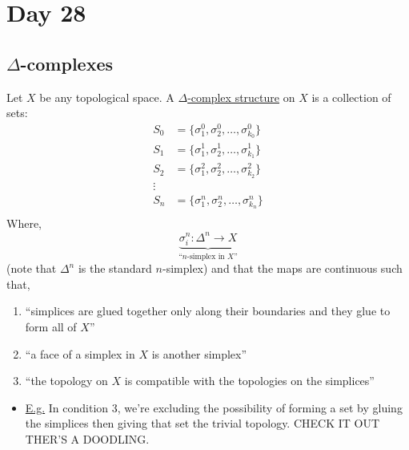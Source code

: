 \documentclass[../notes.tex]{subfiles}
\begin{document}
\section{Day 28}
\subsection{$\Delta$-complexes}
\begin{definition}
    Let $X$ be any topological space.
    A \underline{$\Delta$-complex structure} on $X$ is a collection of sets:
    \begin{align*}
        S_0&=\{\sigma_1^0,\sigma_2^0,\dots,\sigma_{k_0}^0\}\\
        S_1&=\{\sigma_1^1,\sigma_2^1,\dots,\sigma_{k_1}^1\}\\
        S_2&=\{\sigma_1^2,\sigma_2^2,\dots,\sigma_{k_2}^2\}\\
        \vdots&\\
        S_n&=\{\sigma_1^n,\sigma_2^n,\dots,\sigma_{k_n}^n\}\\
    \end{align*}
    Where,
    \[
        \underbrace{\sigma_i^n:\Delta^n\rightarrow X}_{
            \text{``$n$-simplex in $X$''}
        }
    \]
    (note that $\Delta^n$ is the standard $n$-simplex)
    and that the maps are continuous such that,
    \begin{enumerate}
        \item ``simplices are glued together only along their boundaries and they glue to form all of $X$''
        \item ``a face of a simplex in $X$ is another simplex''
        \item ``the topology on $X$ is compatible with the topologies on the simplices''
    \end{enumerate}
    \begin{itemize}
        \item \underline{E.g.} In condition 3, we're excluding the possibility of forming
            a set by gluing the simplices then giving that set the trivial topology. CHECK
            IT OUT THER'S A DOODLING.
    \end{itemize}
    \end{definition}
\end{document}
